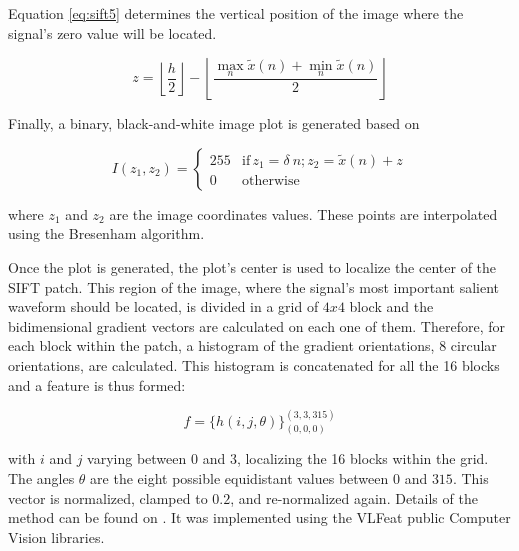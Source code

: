 \documentclass[brainsci,article,submit,moreauthors,pdftex,10pt,a4paper]{mdpi}
\begin{document}
Equation \ref{eq:sift5} determines the vertical position of the image where the signal's zero value will be located.

\begin{equation}
z = \left\lfloor \frac{h}{2} \right\rfloor - \left\lfloor \frac{\max_{n} \tilde{x}(n) + \min_{n} \tilde{x}(n)}{2} \right\rfloor
\label{eq:sift5}
\end{equation}

Finally, a binary, black-and-white image plot is generated based on

\begin{equation}
I(z_1,z_2) = \left\{ \begin{array}{rl}
255 & \text{if} \,  z_1 = \delta \  n; \! z_2 = \tilde{x}(n) + z \\
0   & \mbox{otherwise}
\end{array}\right.
\label{eq:sift6}
\end{equation}

\noindent where $z_1$ and $z_2$ are the image coordinates values.  These points are interpolated using the Bresenham algorithm.

Once the plot is generated, the plot's center is used to localize the center of the SIFT patch. This region of the image, where the signal's most important salient waveform should be located, is divided in a grid of $4 x 4$ block and the bidimensional gradient vectors are calculated on each one of them.  Therefore, for each block within the patch, a histogram of the gradient orientations, 8 circular orientations, are calculated.  This histogram is concatenated for all the 16 blocks and a feature is thus formed:

\begin{equation}
f = {\bigg \{ h(i,j,\theta) \bigg \}}_{(0,0,0)}^{(3,3,315)}
\label{eq:sift7}
\end{equation}

\noindent with $i$ and $j$ varying between $0$ and $3$, localizing the 16 blocks within the grid. The angles $\theta$ are the eight possible equidistant values between $0$ and $315$.  This vector is normalized, clamped to $0.2$, and re-normalized again.   Details of the method can be found on \citep{Ramele2016,Lowe2004}.  It was implemented using the VLFeat  \citep{Vedaldi2010} public Computer Vision libraries.

\end{document}
